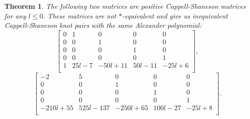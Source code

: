 \documentclass[12pt]{amsart}
\theoremstyle{plain}
\newtheorem{theorem}{Theorem}[section]
\theoremstyle{definition}
\theoremstyle{remark}
\renewcommand{\(}{\big(}
\renewcommand{\)}{\big)}
\theoremstyle{plain}
\theoremstyle{definition}
\begin{document}
\begin{theorem}
    The following two matrices are positive Cappell-Shaneson matrices for any $l \le 0$. These matrices are not $*$-equivalent and give us inequivalent Cappell-Shaneson knot pairs with the same Alexander polynomial:
    \[
        \begin{bmatrix}
    		0 & 1 & 0 & 0 & 0\\
    		0 & 0 & 1 & 0 & 0\\
    		0 & 0 & 0 & 1 & 0\\
                0 & 0 & 0 & 0 & 1\\
                1 & 25l-7 & -50l+11 & 50l-11 & -25l+6\\
    		\end{bmatrix},
    \]
    \[
        \begin{bmatrix}
    	-2 & 5 & 0 & 0 & 0\\
            0 & 0 & 1 & 0 & 0\\
            0 & 0 & 0 & 1 & 0\\
            0 & 0 & 0 & 0 & 1\\
            -210l+55 & 525l-137 & -250l+65 & 100l-27 & -25l+8\\
    		\end{bmatrix}.
    \]

\end{theorem}
\end{document}
